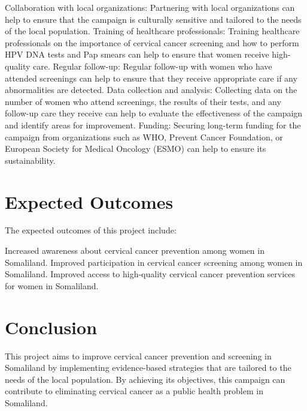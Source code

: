 \documentclass{article}
\begin{document}
\begin{outline} 
\1 Collaboration with local organizations: Partnering with local organizations can help to ensure that the campaign is culturally sensitive and tailored to the needs of the local population. 
\1 Training of healthcare professionals: Training healthcare professionals on the importance of cervical cancer screening and how to perform HPV DNA tests and Pap smears can help to ensure that women receive high-quality care. 
\1 Regular follow-up: Regular follow-up with women who have attended screenings can help to ensure that they receive appropriate care if any abnormalities are detected. 
\1 Data collection and analysis: Collecting data on the number of women who attend screenings, the results of their tests, and any follow-up care they receive can help to evaluate the effectiveness of the campaign and identify areas for improvement. 
\1 Funding: Securing long-term funding for the campaign from organizations such as WHO\citep{wcced2018}, Prevent Cancer Foundation\citep{pcf2023}, or European Society for Medical Oncology (ESMO)\citep{esmo2023} can help to ensure its sustainability. 

\end{outline}

\section{Expected Outcomes}
The expected outcomes of this project include: 
\begin{outline} 
\1 Increased awareness about cervical cancer prevention among women in Somaliland. 
\1 Improved participation in cervical cancer screening among women in Somaliland. 
\1 Improved access to high-quality cervical cancer prevention services for women in Somaliland. \end{outline}

\section{Conclusion}


This project aims to improve cervical cancer prevention and screening in Somaliland by implementing evidence-based strategies that are tailored to the needs of the local population. 
By achieving its objectives, this campaign can contribute to eliminating cervical cancer as a public health problem in Somaliland.

\end{document}
